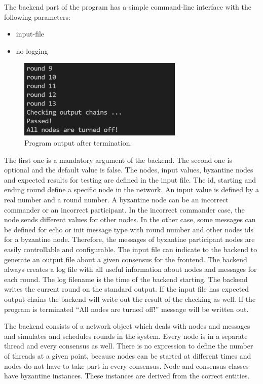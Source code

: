\documentclass{article}
\begin{document}
The backend part of the program has a simple command-line interface with the following parameters:

\begin{itemize}
  \item input-file
  \item no-logging
\end{itemize}

\begin{figure}[hbt!]
    \centering
    \includegraphics[width=0.70\textwidth]{figures/terminal_output.png}
    \caption{Program output after termination.\label{terminal_output_fig}}
\end{figure}

The first one is a mandatory argument of the backend. The second one is optional and the default value is false. The nodes, input values, byzantine nodes and expected results for testing are defined in the input file. The id, starting and ending round define a specific node in the network. An input value is defined by a real number and a round number. A byzantine node can be an incorrect commander or an incorrect participant. In the incorrect commander case, the node sends different values for other nodes. In the other case, some messages can be defined for echo or init message type with round number and other nodes ids for a byzantine node. Therefore, the messages of byzantine participant nodes are easily controllable and configurable. The input file can indicate to the backend to generate an output file about a given consensus for the frontend. The backend always creates a log file with all useful information about nodes and messages for each round. The log filename is the time of the backend starting. The backend writes the current round on the standard output. If the input file has expected output chains the backend will write out the result of the checking as well. If the program is terminated “All nodes are turned off!” message will be written out. 

The backend consists of a network object which deals with nodes and messages and simulates and schedules rounds in the system. Every node is in a separate thread and every consensus as well. There is no expression to define the number of threads at a given point, because nodes can be started at different times and nodes do not have to take part in every consensus. Node and consensus classes have byzantine instances. These instances are derived from the correct entities.
\end{document}
